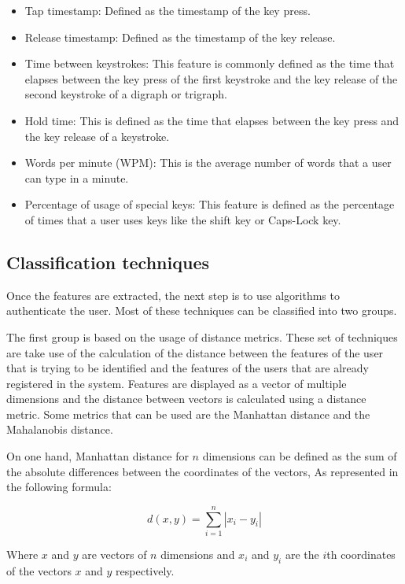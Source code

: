 \begin{itemize}
	\item Tap timestamp: Defined as the timestamp of the key press.
	\item Release timestamp: Defined as the timestamp of the key release.
	\item Time between keystrokes: This feature is commonly defined as the time that elapses between the key press of the first keystroke and the key release of the second keystroke of a digraph or trigraph.
	\item Hold time: This is defined as the time that elapses between the key press and the key release of a keystroke.
	\item Words per minute (WPM): This is the average number of words that a user can type in a minute.
	\item Percentage of usage of special keys: This feature is defined as the percentage of times that a user uses keys like the shift key or Caps-Lock key.
\end{itemize}

\subsection{Classification techniques}

Once the features are extracted, the next step is to use algorithms to authenticate the user. Most of these techniques can be classified into two groups.


The first group is based on the usage of distance metrics. These set of techniques are take use of the calculation of the distance between the features of the user that is trying to be identified and the features of the users that are already registered in the system. Features are displayed as a vector of multiple dimensions and the distance between vectors is calculated using a distance metric. Some metrics that can be used are the Manhattan distance and the Mahalanobis distance.

On one hand, Manhattan distance for $n$ dimensions can be defined as the sum of the absolute differences between the coordinates of the vectors, As represented in the following formula:

\begin{equation}
	d(x,y) = \sum_{i=1}^{n} |x_i - y_i|
	\label{eq:manhattan}
\end{equation}

Where $x$ and $y$ are vectors of $n$ dimensions and $x_i$ and $y_i$ are the $i$th coordinates of the vectors $x$ and $y$ respectively.

